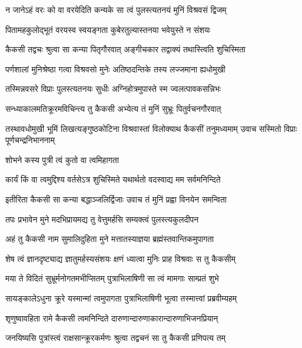 \twolineshloka
{न जानेऽहं वरः को वा वरयेदिति कन्यके}
{सा त्वं पुलस्त्यतनयं मुनिं विश्रवसं द्विजम्}%

\twolineshloka
{पितामहकुलोद्भूतं वरयस्व स्वयङ्गता}
{कुबेरतुल्यास्तनया भवेयुस्ते न संशयः}%

\twolineshloka
{कैकसी तद्वचः श्रुत्वा सा कन्या पितृगौरवात्}
{अङ्गीचकार तद्वाक्यं तथास्त्विति शुचिस्मिता}%

\twolineshloka
{पर्णशालां मुनिश्रेष्ठा गत्वा विश्रवसो मुनेः}
{अतिष्ठदन्तिके तस्य लज्जमाना ह्यधोमुखी}%

\twolineshloka
{तस्मिन्नवसरे विप्राः पुलस्त्यतनयः सुधीः}
{अग्निहोत्रमुपास्ते स्म ज्वलत्पावकसन्निभः}%

\twolineshloka
{सन्ध्याकालमतिक्रूरमविचिन्त्य तु कैकसी}
{अभ्येत्य तं मुनिं सुभ्रूः पितुर्वचनगौरवात्}%

\threelineshloka
{तस्थावधोमुखी भूमिं लिखत्यङ्गुष्ठकोटिना}
{विश्रवास्तां विलोक्याथ कैकसीं तनुमध्यमाम्}
{उवाच सस्मितो विप्राः पूर्णचन्द्रनिभाननाम्}%


\onelineshloka
{शोभने कस्य पुत्री त्वं कुतो वा त्वमिहागता}%

\twolineshloka
{कार्यं किं वा त्वमुद्दिश्य वर्तसेऽत्र शुचिस्मिते}
{यथार्थतो वदस्वाद्य मम सर्वमनिन्दिते}%

\twolineshloka
{इतीरिता कैकसी सा कन्या बद्धाञ्जलिर्द्विजाः}
{उवाच तं मुनिं प्रह्वा विनयेन समन्विता}%

\twolineshloka
{तपः प्रभावेन मुने मदभिप्रायमद्य तु}
{वेत्तुमर्हसि सम्यक्त्वं पुलस्त्यकुलदीपन}%

\twolineshloka
{अहं तु कैकसी नाम सुमालिदुहिता मुने}
{मत्तातस्याज्ञया ब्रह्मंस्तवान्तिकमुपागता}%

\twolineshloka
{शेष त्वं ज्ञानदृष्ट्याद्य ज्ञातुमर्हस्यसंशयः}
{क्षणं ध्यात्वा मुनिः प्राह विश्रवाः स तु कैकसीम्}%

\twolineshloka
{मया ते विदितं सुभ्रूर्मनोगतमभीप्सितम्}
{पुत्राभिलाषिणी सा त्वं मामगाः साम्प्रतं शुभे}%

\twolineshloka
{सायङ्कालेऽधुना क्रूरे यस्मान्मां त्वमुपागता}
{पुत्राभिलाषिणी भूत्वा तस्मात्त्वां प्रब्रवीम्यहम्}%

\twolineshloka
{शृणुष्वावहिता रामे कैकसी त्वमनिन्दिते}
{दारुणान्दारुणाकारान्दारुणाभिजनप्रियान्}%

\twolineshloka
{जनयिष्यसि पुत्रांस्त्वं राक्षसान्क्रूरकर्मणः}
{श्रुत्वा तद्वचनं सा तु कैकसी प्रणिपत्य तम्}%

